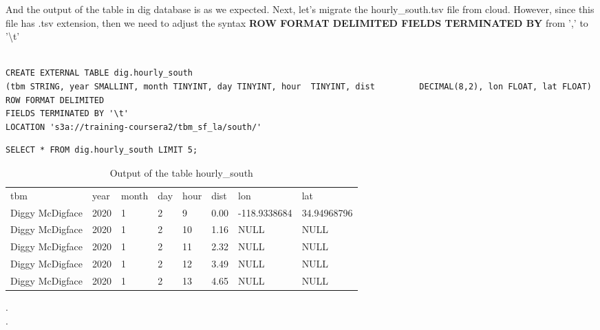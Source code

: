 \documentclass[a4paper,
							12pt,
							oneside,
							openright,
							DIV10,
							numbers=noendperiod
							]{scrreprt} %
\begin{document}
\noindent
And the output of the table in dig database is as we expected. Next, let's migrate the hourly\_south.tsv file from cloud. However, since this file has .tsv extension, then we need to adjust the syntax \textbf{ROW FORMAT DELIMITED FIELDS TERMINATED BY} from ',' to '\textbackslash t'\\
\\

\begin{lstlisting}
CREATE EXTERNAL TABLE dig.hourly_south 
(tbm STRING, year SMALLINT, month TINYINT, day TINYINT, hour  TINYINT, dist 		DECIMAL(8,2), lon FLOAT, lat FLOAT)
ROW FORMAT DELIMITED
FIELDS TERMINATED BY '\t'
LOCATION 's3a://training-coursera2/tbm_sf_la/south/'
\end{lstlisting}

\begin{lstlisting}
SELECT * FROM dig.hourly_south LIMIT 5;
\end{lstlisting}

\begin{table}[ht]
\centering
\caption{Output of the table hourly\_south}
\label{tab:my-table}
\begin{tabular}{llllllll}
{\color[HTML]{000000} tbm} & {\color[HTML]{000000} year} & {\color[HTML]{000000} month} & {\color[HTML]{000000} day} & {\color[HTML]{000000} hour} & {\color[HTML]{000000} dist} & {\color[HTML]{000000} lon} & {\color[HTML]{000000} lat} \\
{\color[HTML]{000000} Diggy McDigface} & {\color[HTML]{000000} 2020} & {\color[HTML]{000000} 1} & {\color[HTML]{000000} 2} & {\color[HTML]{000000} 9} & {\color[HTML]{000000} 0.00} & {\color[HTML]{000000} -118.9338684} & {\color[HTML]{000000} 34.94968796} \\
{\color[HTML]{000000} Diggy McDigface} & {\color[HTML]{000000} 2020} & {\color[HTML]{000000} 1} & {\color[HTML]{000000} 2} & {\color[HTML]{000000} 10} & {\color[HTML]{000000} 1.16} & {\color[HTML]{000000} NULL} & {\color[HTML]{000000} NULL} \\
{\color[HTML]{000000} Diggy McDigface} & {\color[HTML]{000000} 2020} & {\color[HTML]{000000} 1} & {\color[HTML]{000000} 2} & {\color[HTML]{000000} 11} & {\color[HTML]{000000} 2.32} & {\color[HTML]{000000} NULL} & {\color[HTML]{000000} NULL} \\
{\color[HTML]{000000} Diggy McDigface} & {\color[HTML]{000000} 2020} & {\color[HTML]{000000} 1} & {\color[HTML]{000000} 2} & {\color[HTML]{000000} 12} & {\color[HTML]{000000} 3.49} & {\color[HTML]{000000} NULL} & {\color[HTML]{000000} NULL} \\
{\color[HTML]{000000} Diggy McDigface} & {\color[HTML]{000000} 2020} & {\color[HTML]{000000} 1} & {\color[HTML]{000000} 2} & {\color[HTML]{000000} 13} & {\color[HTML]{000000} 4.65} & {\color[HTML]{000000} NULL} & {\color[HTML]{000000} NULL}\\
\end{tabular}
\end{table}
.\\
.\\
\end{document}
